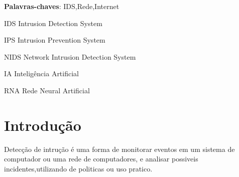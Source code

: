 \documentclass[
	12pt,				%
	openright,			%
	oneside,
	a4paper,			%
	english,			%
	french,				%
	spanish,			%
	brazil				%
	]{abntex2}
\begin{document}
\frenchspacing 


\imprimircapa

\imprimirfolhaderosto%


\setlength{\absparsep}{18pt} %
\begin{resumo}
   
 \textbf{Palavras-chaves}: IDS,Rede,Internet
\end{resumo}

\listoffigures*
\cleardoublepage

\listoftables*
\cleardoublepage

\begin{siglas}
  \item[IDS] Intrusion Detection System
  \item[IPS] Intrusion Prevention System
  \item[NIDS] Network Intrusion Detection System
  \item[IA] Inteligência Artificial
  \item[RNA] Rede Neural Artificial
\end{siglas}

\tableofcontents*
\cleardoublepage

\textual

\chapter[Introdução]{Introdução}
Detecção de intrução é uma forma de monitorar eventos em um sistema de computador ou uma rede de computadores,
e analisar possiveis incidentes,utilizando de politicas ou uso pratico.
\end{document}
